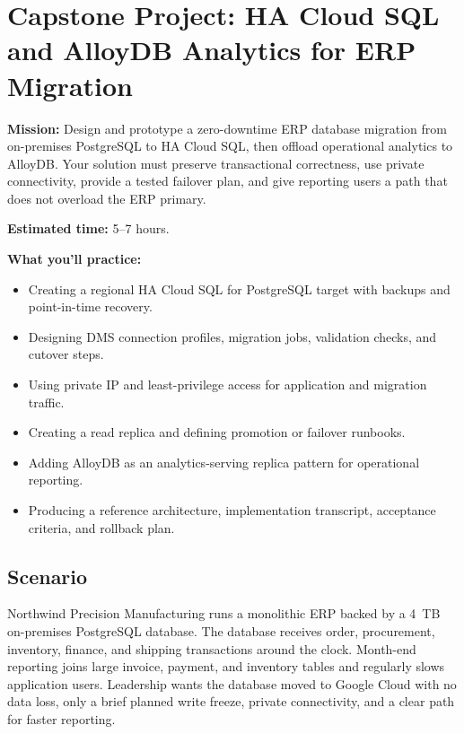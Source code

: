 \section{Capstone Project: HA Cloud SQL and AlloyDB Analytics for ERP Migration}\label{sec:ch2-capstone}

\begin{capstonebox}
\textbf{Mission:} Design and prototype a zero-downtime ERP database migration from on-premises PostgreSQL to HA Cloud SQL, then offload operational analytics to AlloyDB. Your solution must preserve transactional correctness, use private connectivity, provide a tested failover plan, and give reporting users a path that does not overload the ERP primary.

\textbf{Estimated time:} 5--7 hours.

\textbf{What you'll practice:}
\begin{itemize}
    \item Creating a regional HA Cloud SQL for PostgreSQL target with backups and point-in-time recovery.
    \item Designing DMS connection profiles, migration jobs, validation checks, and cutover steps.
    \item Using private IP and least-privilege access for application and migration traffic.
    \item Creating a read replica and defining promotion or failover runbooks.
    \item Adding AlloyDB as an analytics-serving replica pattern for operational reporting.
    \item Producing a reference architecture, implementation transcript, acceptance criteria, and rollback plan.
\end{itemize}
\end{capstonebox}

\subsection*{Scenario}
Northwind Precision Manufacturing runs a monolithic ERP backed by a 4~TB on-premises PostgreSQL database. The database receives order, procurement, inventory, finance, and shipping transactions around the clock. Month-end reporting joins large invoice, payment, and inventory tables and regularly slows application users. Leadership wants the database moved to Google Cloud with no data loss, only a brief planned write freeze, private connectivity, and a clear path for faster reporting.

